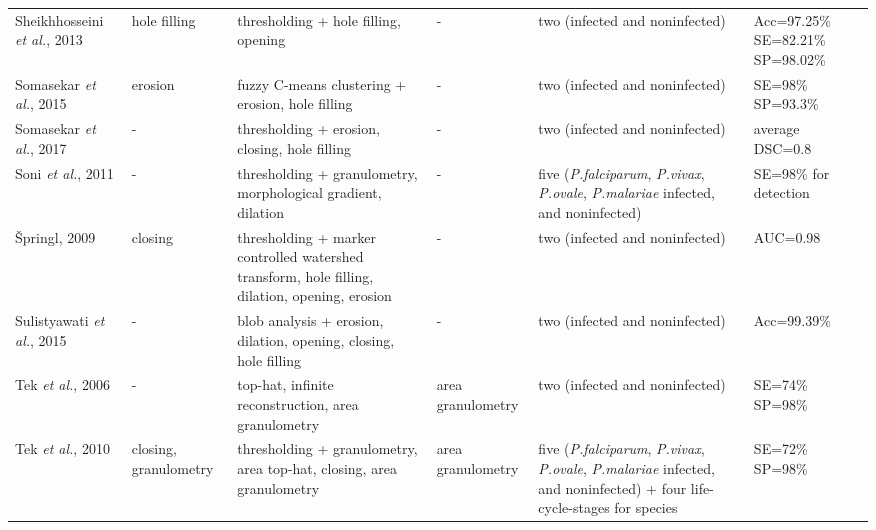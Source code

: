 \begin{longtable}{C{2.1cm} C{2.4cm} C{2.3cm} H C{2.7cm} C{2.2cm} }
	Sheikhhosseini \emph{et al.}, 2013  &
	hole filling &
	thresholding + hole filling, opening  &
	- &
	two (infected and noninfected) &
	Acc=97.25\% SE=82.21\% SP=98.02\% \vspace{0.6cm} \\
	
	Somasekar \emph{et al.}, 2015  &
	erosion &
	fuzzy C-means clustering + erosion, hole filling  &
	- &
	two (infected and noninfected) &
	SE=98\% SP=93.3\% \vspace{0.6cm} \\
	
	Somasekar \emph{et al.}, 2017  &
	- &
	thresholding + erosion, closing, hole filling  &
	- &
	two (infected and noninfected) &
	average DSC=0.8 \vspace{0.6cm} \\
	
	Soni \emph{et al.}, 2011  &
	- &
	thresholding + granulometry, morphological gradient, dilation  &
	- &
	five (\emph{P.falciparum}, \emph{P.vivax}, \emph{P.ovale}, \emph{P.malariae} infected, and noninfected) &
	SE=98\% for detection  \vspace{0.6cm} \\
	
	{\v{S}}pringl, 2009  &
	closing &
	thresholding + marker controlled watershed transform, hole filling, dilation, opening, erosion  &
	- &
	two (infected and noninfected) &
	AUC=0.98 \vspace{0.6cm} \\
	
	Sulistyawati \emph{et al.}, 2015  &
	- &
	blob analysis + erosion, dilation, opening, closing, hole filling  &
	- &
	two (infected and noninfected) &
	Acc=99.39\% \vspace{0.6cm} \\
	
	Tek \emph{et al.}, 2006  &
	- &
	top-hat, infinite reconstruction, area granulometry  &
	area granulometry &
	two (infected and noninfected) &
	SE=74\% SP=98\% \vspace{0.6cm} \\
	
	Tek \emph{et al.}, 2010  &
	closing, granulometry &
	thresholding + granulometry, area top-hat, closing, area granulometry &
	area granulometry &
	five (\emph{P.falciparum}, \emph{P.vivax}, \emph{P.ovale}, \emph{P.malariae} infected, and noninfected) +
	four life-cycle-stages for species &
	SE=72\% SP=98\% \vspace{0.6cm} \\
	

\end{longtable}

